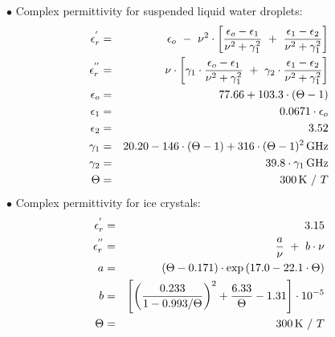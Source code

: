 {\noindent$\bullet$ Complex permittivity for suspended liquid water droplets:
\begin{eqnarray}
  \label{eq:comp_perm_lwc}
  \ree       & = & \epsilon_o~-~\nu^2\cdot
                   \left[\frac{\epsilon_o-\epsilon_1}{\nu^2+\gamma_1^2}~+~
                   \frac{\epsilon_1-\epsilon_2}{\nu^2+\gamma_1^2}\right]\nonumber\\
%
  \ime       & = & \nu\cdot\left[\gamma_1\cdot
                   \frac{\epsilon_o-\epsilon_1}{\nu^2+\gamma_1^2}~+~
                   \gamma_2\cdot\frac{\epsilon_1-\epsilon_2}{\nu^2+\gamma_1^2}\right]\nonumber\\
%
  \epsilon_o & = & 77.66 + 103.3\cdot(\Theta-1)\nonumber\\
  \epsilon_1 & = & 0.0671\cdot\epsilon_o\nonumber\\
  \epsilon_2 & = & 3.52\nonumber\\
%
  \gamma_1   & = & 20.20 - 146\cdot(\Theta-1) + 316\cdot(\Theta-1)^2\,\mbox{GHz}\nonumber\\
  \gamma_2   & = & 39.8\cdot\gamma_1\,\mbox{GHz}\nonumber\\
%
  \Theta     & = & 300\,\mbox{K}~/~T\nonumber\\
%
\end{eqnarray}
$\bullet$ Complex permittivity for ice crystals:
\begin{eqnarray}
  \label{eq:comp_perm_iwc}
  \ree    & = & 3.15\nonumber\\
%
  \ime    & = & \frac{a}{\nu}~+~b\cdot\nu\nonumber\\
%
  a       & = & (\Theta-0.171)\cdot\exp{(17.0-22.1\cdot\Theta)}\nonumber\\
  b       & = & \left[\left(\frac{0.233}{1-0.993/\Theta}\right)^2 + 
                \frac{6.33}{\Theta} - 1.31\right]\cdot10^{-5}\nonumber\\
%
  \Theta  & = & 300\,\mbox{K}~/~T\nonumber\\
%

\end{eqnarray}}
